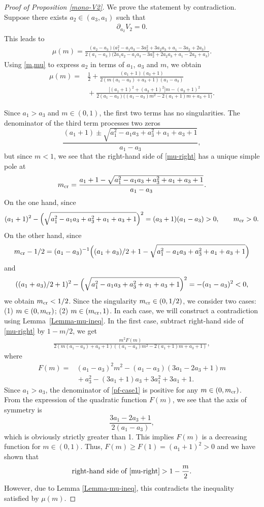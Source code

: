 \documentclass[pdftex]{sigma}
\numberwithin{equation}{section}
\begin{document}
\begin{proof}[Proof of Proposition \ref{mono-V2}]
We prove the statement by contradiction. Suppose there exists $a_2\in (a_3,a_1)$ such that
\begin{align*}
\partial_{a_2}V_2=0.
\end{align*}
This leads to
\begin{align*}
\mu(m)=\frac{(a_2-a_3)\bigl(a_1^2-a_1a_3-3a_2^2+3a_2a_3+a_1-3a_2+2a_3\bigr)}{2(a_1-a_3)\bigl(2a_1a_2-a_1a_3-3a_2^2+2a_2a_3+a_1-2a_2+a_3\bigr)}.
\end{align*}
Using \eqref{m,mu} to express
$a_2$ in terms of $a_1$, $a_3$ and $m$, we obtain
\begin{align}
\mu(m)={}&\frac{1}{2}+\frac{(a_1+1)(a_3+1)}{2(m(a_1-a_3)+a_3+1)(a_1-a_3)}\nonumber\\
&{}+\frac{\bigl[(a_1+1)^2+(a_3+1)^2\bigr]m-(a_3+1)^2}{2(a_1-a_3)\bigl((a_1-a_3)m^2-2(a_1+1)m+a_3+1\bigr)}.\label{mu-right}
\end{align}

Since $a_1>a_3$ and $m\in (0,1)$, the first two terms has no singularities. The denominator of the third term processes two zeros
\[\frac{(a_1+1)\pm\sqrt{a_1^2-a_1a_3+a_3^2+a_1+a_3+1}}{a_1-a_3},\]
but since $m<1$, we see that the right-hand side of \eqref{mu-right} has a unique simple pole at
\begin{align*}
m_{\rm cr}=\frac{a_1+1-\sqrt{a_1^2-a_1a_3+a_3^2+a_1+a_3+1}}{a_1-a_3}.
\end{align*}
On the one hand, since
\[
(a_1+1)^2-\Bigl(\sqrt{a_1^2-a_1a_3+a_3^2+a_1+a_3+1}\Bigr)^2=(a_3+1)(a_1-a_3)>0, \qquad m_{\rm cr}>0.
\]
 On the other hand, since
 \[
 m_{\rm cr}-1/2=(a_1-a_3)^{-1}\Bigl((a_1+a_3)/2+1-\sqrt{a_1^2-a_1a_3+a_3^2+a_1+a_3+1}\Bigr)
 \]
 and
 \[
 ((a_1+a_3)/2+1)^2-\Bigl(\sqrt{a_1^2-a_1a_3+a_3^2+a_1+a_3+1}\Bigr)^2=-(a_1-a_3)^2<0,
\]
we obtain $m_{\rm cr}<1/2$. Since the singularity $m_{\rm cr}\in (0,1/2)$, we consider two cases: (1) $m\in (0,m_{\rm cr})$; (2) $m\in (m_{\rm cr},1)$. In each case, we will construct a contradiction using Lemma~\ref{Lemma-mu-ineq}.
In the first case, subtract right-hand side of \eqref{mu-right} by $1-m/2$, we get
\begin{align}
\frac{m^2 F(m)}{2(m(a_1-a_3)+a_3+1)((a_1-a_3)m^2-2(a_1+1)m+a_3+1)},\label{pf-case1}
\end{align}
where
\begin{align*}
F(m)={}&(a_1-a_3)^2m^2-(a_1-a_3)(3a_1-2a_3+1)m\\
&{}+a_3^2-(3a_1+1)a_3+3a_1^2+3a_1+1.
\end{align*}
Since $a_1>a_3$, the denominator of \eqref{pf-case1} is positive for any $m\in (0,m_{\rm cr})$. From the expression of the quadratic function $F(m)$, we see that the axis of symmetry is
\[\frac{3a_1-2a_3+1}{2(a_1-a_3)},\]
which is obviously strictly greater than 1. This implies $F(m)$ is a decreasing function for $m\in (0,1)$. Thus, $F(m)\geq F(1)=(a_1+1)^2>0$ and we have shown that
\begin{align*}
\text{right-hand side of \eqref{mu-right}}>1-\frac{m}{2}.
\end{align*}
However, due to Lemma \ref{Lemma-mu-ineq}, this contradicts the inequality satisfied by $\mu(m)$.


\end{proof}
\end{document}

